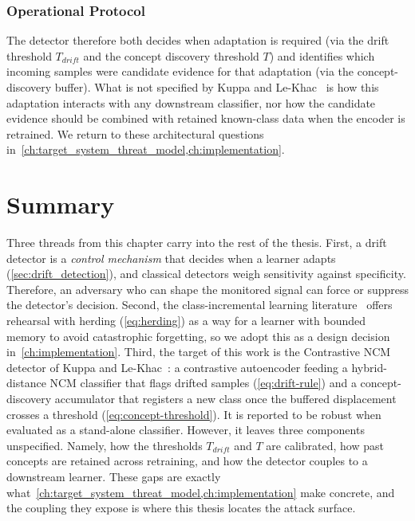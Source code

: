 \subsubsection{Operational Protocol}
The detector therefore both decides when adaptation is required (via the drift threshold $T_{drift}$ and the concept discovery threshold $T$) and identifies which incoming samples were candidate evidence for that adaptation (via the concept-discovery buffer). What is not specified by Kuppa and Le-Khac~\cite{Kuppa_2022} is how this adaptation interacts with any downstream classifier, nor how the candidate evidence should be combined with retained known-class data when the encoder is retrained. We return to these architectural questions in~\cref{ch:target_system_threat_model,ch:implementation}.

\section{Summary}
\label{sec:bg-summary}
Three threads from this chapter carry into the rest of the thesis. First, a drift detector is a \emph{control mechanism} that decides when a learner adapts (\cref{sec:drift_detection}), and classical detectors weigh sensitivity against specificity. Therefore, an adversary who can shape the monitored signal can force or suppress the detector's decision. Second, the class-incremental learning literature~\cite{Robins_1995, Rebuffi_2017} offers rehearsal with herding (\cref{eq:herding}) as a way for a learner with bounded memory to avoid catastrophic forgetting, so we adopt this as a design decision in~\cref{ch:implementation}. Third, the target of this work is the Contrastive NCM detector of Kuppa and Le-Khac~\cite{Kuppa_2022}: a contrastive autoencoder feeding a hybrid-distance NCM classifier that flags drifted samples (\cref{eq:drift-rule}) and a concept-discovery accumulator that registers a new class once the buffered displacement crosses a threshold (\cref{eq:concept-threshold}). It is reported to be robust when evaluated as a stand-alone classifier. However, it leaves three components unspecified. Namely, how the thresholds $T_{drift}$ and $T$ are calibrated, how past concepts are retained across retraining, and how the detector couples to a downstream learner. These gaps are exactly what~\cref{ch:target_system_threat_model,ch:implementation} make concrete, and the coupling they expose is where this thesis locates the attack surface.
